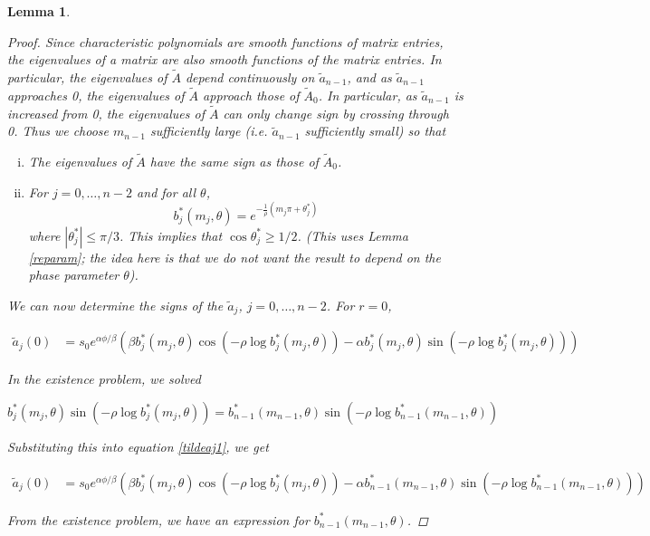 \documentclass[12pt]{article}
\newtheorem{lemma}{Lemma}
\begin{document}
\begin{lemma}
\begin{proof}
Since characteristic polynomials are smooth functions of matrix entries, the eigenvalues of a matrix are also smooth functions of the matrix entries. In particular, the eigenvalues of $\tilde{A}$ depend continuously on $\tilde{a}_{n-1}$, and as $\tilde{a}_{n-1}$ approaches 0, the eigenvalues of $\tilde{A}$ approach those of $\tilde{A}_0$. In particular, as $\tilde{a}_{n-1}$ is increased from 0, the eigenvalues of $\tilde{A}$ can only change sign by crossing through 0. Thus we choose $m_{n-1}$ sufficiently large (i.e. $\tilde{a}_{n-1}$ sufficiently small) so that

\begin{enumerate}[(i)]
	\item The eigenvalues of $\tilde{A}$ have the same sign as those of $\tilde{A}_0$.
	\item For $j = 0, \dots, n-2$ and for all $\theta$,
	\[
	b^*_j(m_j, \theta) = e^{ -\frac{1}{\rho} ( m_j \pi + \theta^*_j ) }
	\]
	where $|\theta^*_j| \leq \pi/3$. This implies that $\cos \theta^*_j \geq 1/2$. (This uses Lemma \ref{reparam}; the idea here is that we do not want the result to depend on the phase parameter $\theta$).
\end{enumerate}

We can now determine the signs of the $\tilde{a}_j$, $j = 0, \dots, n-2$. For $r = 0$,

\begin{align}\label{tildeaj1}
\tilde{a}_j(0)
&= s_0 e^{\alpha \phi/\beta} \left( \beta b^*_j(m_j, \theta) \cos\left( -\rho \log b^*_j(m_j, \theta) \right) - \alpha b^*_j(m_j, \theta) \sin \left(  -\rho \log b^*_j(m_j, \theta) \right) \right) 
\end{align}

In the existence problem, we solved

\[
b^*_j(m_j, \theta) \sin \left( -\rho \log b^*_j(m_j, \theta) \right) = b^*_{n-1}(m_{n-1}, \theta) \sin \left( -\rho \log b^*_{n-1}(m_{n-1}, \theta) \right)
\]

Substituting this into equation \eqref{tildeaj1}, we get

\begin{align}\label{tildeaj2}
\tilde{a}_j(0) 
&= s_0 e^{\alpha \phi/\beta} \left( \beta b^*_j(m_j, \theta) \cos\left( -\rho \log b^*_j(m_j, \theta) \right) - \alpha b^*_{n-1}(m_{n-1}, \theta) \sin \left(  -\rho \log b^*_{n-1}(m_{n-1}, \theta) \right) \right) 
\end{align}

From the existence problem, we have an expression for $b^*_{n-1}(m_{n-1}, \theta)$.


\end{proof}
\end{lemma}
\end{document}
